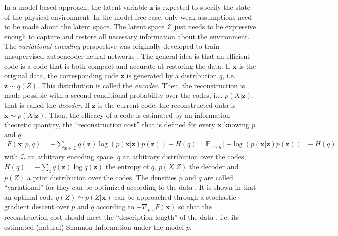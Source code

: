 \documentclass{article}
\begin{document}
In a model-based approach, the latent variable $\boldsymbol{z}$ is expected to specify the state of the physical environment. In the model-free case, only weak assumptions need to be made about the latent space.  The latent space $\mathcal{Z}$ just needs to be expressive enough to capture and restore all necessary information about the environment.  The \emph{variational encoding} perspective  was originally developed 
to train unsupervised autoencoder neural networks \citep{hinton2006reducing}. The general idea is that an efficient code 
is a code that is both compact and accurate at restoring the data. 
If $\boldsymbol{x}$ is the original data, the corresponding code $\boldsymbol{z}$ is generated by a distribution $q$, i.e. $\boldsymbol{z} \sim q(Z)$. This distribution is called the \emph{encoder}. Then, the reconstruction is made possible with a second conditional probability over the codes, i.e. $p(X|\boldsymbol{z})$, that is called the \emph{decoder}. If $\boldsymbol{z}$ is the current code, the reconstructed data is $\tilde{\boldsymbol{x}} \sim p(X|\boldsymbol{z})$. 
Then, the efficacy of a code is estimated by an information-theoretic quantity, the ``reconstruction cost'' \citep{hinton1994autoencoders} that is defined for every $\boldsymbol{x}$ knowing $p$ and $q$:
\begin{align}
F(\boldsymbol{x};p,q) = - \sum_{\boldsymbol{z} \in \mathcal{Z}} q(\boldsymbol{z}) \log (p(\boldsymbol{x}|\boldsymbol{z})p(\boldsymbol{z})) - H(q)
= \mathbb{E}_{z\sim q} \left[-\log (p(\boldsymbol{x}|\boldsymbol{z})p(\boldsymbol{z}))\right] - H(q)
\label{eq:FEP-energy}
\end{align}
with $\mathcal{Z}$ an arbitrary encoding space, $q$ an arbitrary distribution over the codes, $H(q) = -\sum_z q(\boldsymbol{z}) \log q(\boldsymbol{z})$ the entropy of $q$, $p(X|Z)$ the decoder and $p(Z)$ a prior distribution over the codes.
The densities $p$ and $q$ are called ``variational'' for they can be optimized according to the data \citep{hinton2006fast,kingma2013auto}.  
It is shown in \cite{kingma2013auto} that an optimal code $q(Z)\simeq p(Z|\boldsymbol{x})$ can be approached through a stochastic gradient descent over $p$ and $q$ according to $-\nabla_{p,q} F(\boldsymbol{x}) $	so that the reconstruction cost should meet the ``description length'' of the data \citep{hinton1994autoencoders}, i.e. its estimated (natural) Shannon Information under the model $p$.
\end{document}
